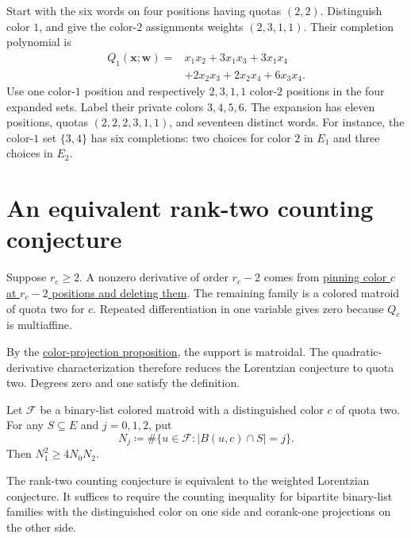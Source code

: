 \begin{example}
Start with the six words on four positions having quotas $(2,2)$.
Distinguish color $1$, and give the color-$2$ assignments weights
$(2,3,1,1)$. Their completion polynomial is
\[
 \begin{aligned}
 Q_1(\mathbf x;\mathbf w)
 ={}&x_1x_2+3x_1x_3+3x_1x_4\\
 &+2x_2x_3+2x_2x_4+6x_3x_4.
 \end{aligned}
\]
Use one color-$1$ position and respectively $2,3,1,1$ color-$2$
positions in the four expanded sets. Label their private colors
$3,4,5,6$. The expansion has eleven positions, quotas
$(2,2,2,3,1,1)$, and seventeen distinct words.
For instance, the color-$1$ set $\{3,4\}$ has six completions: two
choices for color $2$ in $E_1$ and three choices in $E_2$.
\end{example}

\section[quadraticCounting]{An equivalent rank-two counting conjecture}

Suppose $r_c\geq2$. A nonzero derivative of order $r_c-2$ comes from
\href{operations.htm#deletionAndContraction}{pinning color $c$ at
$r_c-2$ positions and deleting them}. The remaining family is a colored
matroid of quota two for $c$. Repeated differentiation in one variable
gives zero because $Q_c$ is multiaffine.

By the \href{intro.htm#coloredMatroids}{color-projection proposition},
the support is matroidal. The quadratic-derivative characterization
\cite[Theorem~2.25]{BrandenHuh2020} therefore reduces the Lorentzian
conjecture to quota two. Degrees zero and one satisfy the definition.

\begin{conjecture}
Let $\mathcal F$ be a binary-list colored matroid with a distinguished
color $c$ of quota two. For any $S\subseteq E$ and $j=0,1,2$, put
\[
 N_j\coloneqq\#\{u\in\mathcal F:|B(u,c)\cap S|=j\}.
\]
Then $N_1^2\geq4N_0N_2$.
\end{conjecture}

\begin{theorem}
The rank-two counting conjecture is equivalent to the weighted
Lorentzian conjecture. It suffices to require the counting inequality
for bipartite binary-list families with the distinguished color on
one side and corank-one projections on the other side.
\end{theorem}

